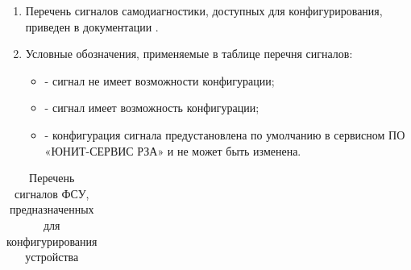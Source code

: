 \areaset{267mm}{180mm}
\fancyheadoffset{0pt} %


\begin{landscape}

\setlength{\footskip}{15.5pt}

\color{black}

\begin{enumerate}[label=\ref{app:signals}.\arabic*] %
  \item Перечень сигналов самодиагностики, доступных для конфигурирования, приведен в документации \ManualUnitGeneral.
  \item Условные обозначения, применяемые в таблице перечня сигналов:
  \begin{itemize}
    \item[$\text{(--)}$] { - сигнал не имеет возможности конфигурации;}
    \item[$\text{(+)}$] { - сигнал имеет возможность конфигурации;}
    \item[$\text{(*)}$] { - конфигурация сигнала предустановлена по умолчанию в сервисном ПО «ЮНИТ-СЕРВИС РЗА» и не может быть изменена.}
  \end{itemize}
\end{enumerate}

\small
\begin{longtable}{
>{\centering\arraybackslash}m{6.0cm}
|>{\centering\arraybackslash}m{3.45cm}
|>{\centering\arraybackslash}m{2cm}
|>{\centering\arraybackslash}m{2cm}
|>{\centering\arraybackslash}m{2cm}
|>{\centering\arraybackslash}m{2cm}
|>{\centering\arraybackslash}m{2cm}
|>{\centering\arraybackslash}m{2cm}
|>{\centering\arraybackslash}m{2.09cm}
}

\caption{Перечень сигналов ФСУ, предназначенных для конфигурирования устройства\hfill\vspace{-0.5\baselineskip}}\label{appA:tbl1}\\ 


\end{longtable}
\end{landscape}

